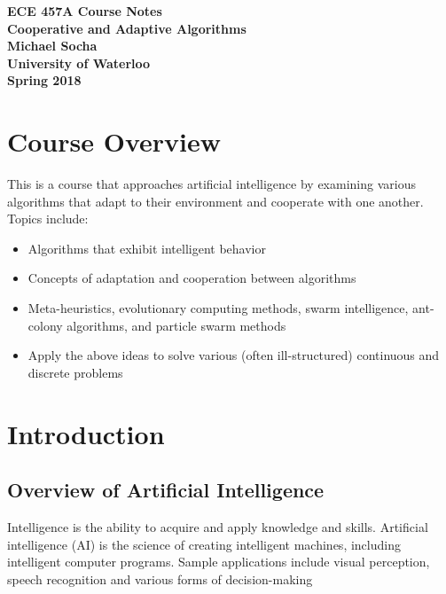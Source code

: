 \documentclass[12pt,titlepage]{article}
\let\stdsection\section
\renewcommand\section{\clearpage\stdsection}
\begin{document}
  \begin{titlepage}
    \vspace*{\fill}
    \centering

    \textbf{\Huge ECE 457A Course Notes} \\ [0.4em]
    \textbf{\Large Cooperative and Adaptive Algorithms} \\ [1em]
    \textbf{\Large Michael Socha} \\ [1em]
    \textbf{\large University of Waterloo} \\
    \textbf{\large Spring 2018} \\
    \vspace*{\fill}
  \end{titlepage}

  \newpage 


  \tableofcontents

  \newpage


  \section{Course Overview}
    This is a course that approaches artificial intelligence by examining various algorithms that adapt to their
    environment and cooperate with one another. Topics include:
    \begin{itemize}
      \item Algorithms that exhibit intelligent behavior
      \item Concepts of adaptation and cooperation between algorithms
      \item Meta-heuristics, evolutionary computing methods, swarm intelligence, ant-colony algorithms, and particle
      swarm methods
      \item Apply the above ideas to solve various (often ill-structured) continuous and discrete problems
    \end{itemize}

  \section{Introduction}

    \subsection{Overview of Artificial Intelligence}
      Intelligence is the ability to acquire and apply knowledge and skills. Artificial intelligence (AI) is the science of creating intelligent machines,
      including intelligent computer programs. Sample applications include visual perception, speech recognition and various forms of decision-making
\end{document}
